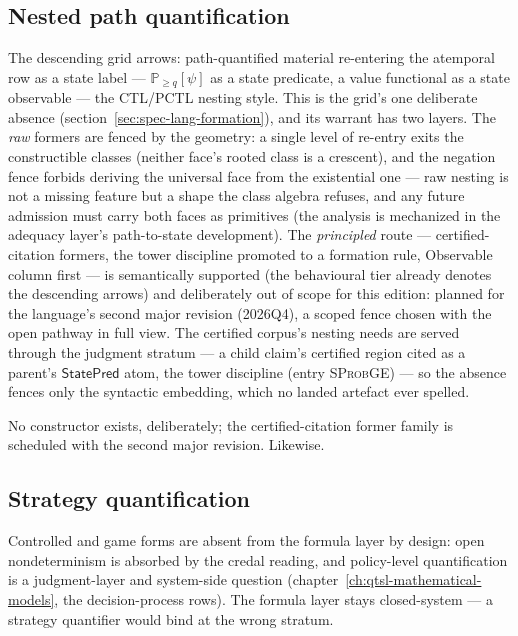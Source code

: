\subsection{Nested path quantification}
\label{sec:spec-lang-fnest}


The descending grid arrows: path-quantified material re-entering the
atemporal row as a state label --- $\mathbb{P}_{\ge q}[\psi]$ as a
state predicate, a value functional as a state observable --- the
CTL/PCTL nesting style. This is the grid's one deliberate absence
(section~\ref{sec:spec-lang-formation}), and its warrant has two
layers. The \emph{raw} formers are fenced by the geometry: a single
level of re-entry exits the constructible classes (neither face's
rooted class is a crescent), and the negation fence forbids deriving
the universal face from the existential one --- raw nesting is not a
missing feature but a shape the class algebra refuses, and any
future admission must carry both faces as primitives (the analysis
is mechanized in the adequacy layer's path-to-state development).
The \emph{principled} route --- certified-citation formers, the
tower discipline promoted to a formation rule, Observable column
first --- is semantically supported (the behavioural tier already
denotes the descending arrows) and deliberately out of scope for
this edition: planned for the language's second major revision
(2026Q4), a scoped fence chosen with the open pathway in full view.
The certified corpus's nesting needs are served through the judgment
stratum --- a child claim's certified region cited as a parent's
$\mathsf{StatePred}$ atom, the tower discipline (entry
\textsc{SProbGE}) --- so the absence fences only the syntactic
embedding, which no landed artefact ever spelled.

No constructor exists, deliberately; the certified-citation former
family is scheduled with the second major revision.
Likewise.

\subsection{Strategy quantification}
\label{sec:spec-lang-fgame}


Controlled and game forms are absent from the formula layer by
design: open nondeterminism is absorbed by the credal reading, and
policy-level quantification is a judgment-layer and system-side
question (chapter~\ref{ch:qtsl-mathematical-models}, the
decision-process rows). The formula layer stays closed-system --- a
strategy quantifier would bind at the wrong stratum.

